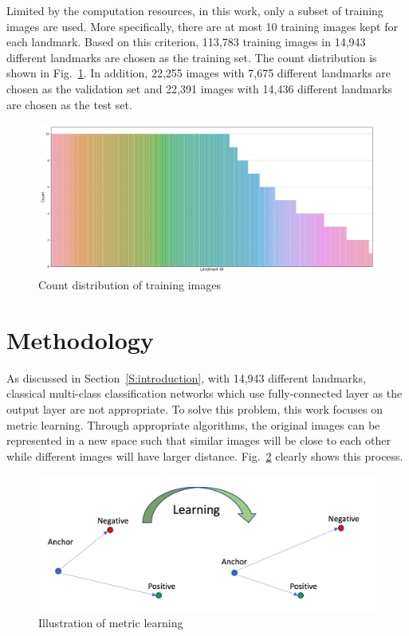 \documentclass[final,3p]{elsarticle}
\begin{document}
Limited by the computation resources, in this work, only a subset of training images are used. More specifically, there are at most 10 training images kept for each landmark. Based on this criterion, 113,783 training images in 14,943 different landmarks are chosen as the training set. The count distribution is shown in Fig.~\ref{fig:subset_distribution}. In addition, 22,255 images with 7,675 different landmarks are chosen as the validation set and 22,391 images with 14,436 different landmarks are chosen as the test set.

\begin{figure}[hbtp]
\centering\includegraphics[width=1.0\linewidth]{./figures/subset_distribution.png}
\caption{Count distribution of training images}
\label{fig:subset_distribution}
\end{figure}


\section{Methodology}
\label{S:method}

As discussed in Section~\ref{S:introduction}, with 14,943 different landmarks, classical multi-class classification networks which use fully-connected layer as the output layer are not appropriate. To solve this problem, this work focuses on metric learning. Through appropriate algorithms, the original images can be represented in a new space such that similar images will be close to each other while different images will have larger distance. Fig.~\ref{fig:triplet_learning} clearly shows this process.

\begin{figure}[h]
\centering\includegraphics[width=0.8\linewidth]{./figures/learning.png}
\caption{Illustration of metric learning}
\label{fig:triplet_learning}
\end{figure}
\end{document}
